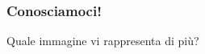 
\begin{contentframe}
    \frametitle{Conosciamoci!}
    
    Quale immagine vi rappresenta di più?

    \bigskip
    \begin{columns}
        \centering
        
        \centering
        
        \centering
    \end{columns}
\end{contentframe}
